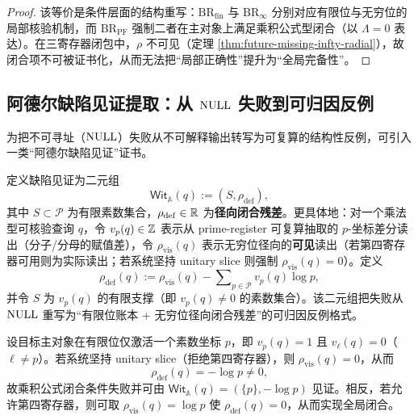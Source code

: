 \begin{proof}
该等价是条件层面的结构重写：$\mathrm{BR}_{\mathrm{fin}}$ 与 $\mathrm{BR}_{\infty}$ 分别对应有限位与无穷位的局部核验机制，而 $\mathrm{BR}_{\mathrm{PF}}$ 强制二者在主对象上满足乘积公式型闭合（以 $\Lambda=0$ 表达）。在三寄存器闭包中，$\rho$ 不可见（定理 \ref{thm:future-missing-infty-radial}），故闭合项不可被证书化，从而无法把“局部正确性”提升为“全局完备性”。
\end{proof}

\subsection{阿德尔缺陷见证提取：从 \texorpdfstring{$\mathrm{NULL}$}{NULL} 失败到可归因反例}\label{subsubsec:future-adelic-witness}
为把不可寻址（$\mathrm{NULL}$）失败从不可解释输出转写为可复算的结构性反例，可引入一类“阿德尔缺陷见证”证书。

\begin{definition}[阿德尔缺陷见证]\label{def:future-adelic-defect}
定义缺陷见证为二元组
$$
\mathsf{Wit}_{\mathbb{A}}(q):=(S,\rho_{\mathrm{def}}),
$$
其中 $S\subset\mathcal{P}$ 为有限素数集合，$\rho_{\mathrm{def}}\in\mathbb{R}$ 为\textbf{径向闭合残差}。更具体地：对一个乘法型可核验查询 $q$，令 $v_p(q)\in\mathbb{Z}$ 表示从 prime-register 可复算抽取的 $p$-坐标差分读出（分子/分母的赋值差），令 $\rho_{\mathrm{vis}}(q)$ 表示无穷位径向的\textbf{可见}读出（若第四寄存器可用则为实际读出；若系统坚持 unitary slice 则强制 $\rho_{\mathrm{vis}}(q)=0$）。定义
$$
\rho_{\mathrm{def}}(q):=\rho_{\mathrm{vis}}(q)-\sum\nolimits_{p\in\mathcal{P}} v_p(q)\log p,
$$
并令 $S$ 为 $v_p(q)$ 的有限支撑（即 $v_p(q)\neq 0$ 的素数集合）。该二元组把失败从 $\mathrm{NULL}$ 重写为“有限位账本 + 无穷位径向闭合残差”的可归因反例格式。
\end{definition}

\begin{example}\label{ex:future-prime-defect}
设目标主对象在有限位仅激活一个素数坐标 $p$，即 $v_p(q)=1$ 且 $v_\ell(q)=0$（$\ell\neq p$）。若系统坚持 unitary slice（拒绝第四寄存器），则 $\rho_{\mathrm{vis}}(q)=0$，从而
$$
\rho_{\mathrm{def}}(q)=-\log p\neq 0,
$$
故乘积公式闭合条件失败并可由 $\mathsf{Wit}_{\mathbb{A}}(q)=(\{p\},-\log p)$ 见证。相反，若允许第四寄存器，则可取 $\rho_{\mathrm{vis}}(q)=\log p$ 使 $\rho_{\mathrm{def}}(q)=0$，从而实现全局闭合。
\end{example}


